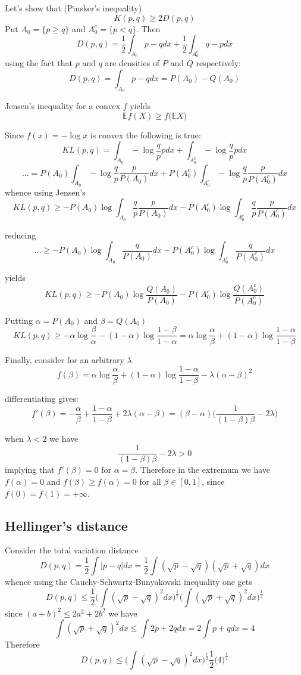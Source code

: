 \documentclass[a4paper]{article}
\newcommand{\ex}{\mathbb{E}}
\begin{document}
Let's show that (Pinsker's inequality)
\[K(p,q)\geq 2 D(p,q)\]
Put $A_0 = \{ p \geq q \}$ and $A_0^c = \{p < q\}$. Then 
\[D(p,q) = \frac{1}{2}\int_{A_0} p-q dx + \frac{1}{2}\int_{A_0^c} q - p dx \]
using the fact that $p$ and $q$ are densities of $P$ and $Q$ respectively:
\[D(p,q) = \int_{A_0} p-q dx = P(A_0) - Q(A_0)\]

Jensen's inequality for a convex $f$ yields
\[\ex f(X) \geq f\big(\ex X\big)\]

Since $f(x) = -\log x$ is convex the following is true:
\[KL(p,q) = \int_{A_0} -\log\frac{q}{p} p dx + \int_{A_0^c} -\log\frac{q}{p} p dx \]
\[\ldots = P(A_0) \int_{A_0} -\log\frac{q}{p} \frac{p}{P(A_0)} dx + P(A_0^c) \int_{A_0^c} -\log\frac{q}{p} \frac{p}{P(A_0^c)} dx \]
whence using Jensen's
\[KL(p,q) \geq  -P(A_0) \log \int_{A_0}\frac{q}{p} \frac{p}{P(A_0)} dx - P(A_0^c) \log \int_{A_0^c} \frac{q}{p} \frac{p}{P(A_0^c)} dx\]

reducing
\[\ldots \geq -P(A_0) \log \int_{A_0}\frac{q}{P(A_0)} dx -P(A_0^c) \log \int_{A_0^c} \frac{q}{P(A_0^c)} dx \]

yields
\[KL(p,q) \geq -P(A_0) \log \frac{Q(A_0)}{P(A_0)} -P(A_0^c) \log \frac{Q(A_0^c)}{P(A_0^c)} \]

Putting $\alpha = P(A_0)$ and $\beta = Q(A_0)$
\[KL(p,q) \geq -\alpha \log \frac{\beta}{\alpha} -(1-\alpha) \log \frac{1-\beta}{1-\alpha} = \alpha \log \frac{\alpha}{\beta} + (1-\alpha) \log \frac{1-\alpha}{1-\beta} \]

Finally, consider for an arbitrary $\lambda$
\[f(\beta) = \alpha \log \frac{\alpha}{\beta} + (1-\alpha) \log \frac{1-\alpha}{1-\beta} - \lambda (\alpha - \beta)^2\]

differentiating gives:
\[f'(\beta) = -\frac{\alpha}{\beta} + \frac{1-\alpha}{1-\beta} + 2\lambda (\alpha - \beta) = (\beta - \alpha)\Big(\frac{1}{(1-\beta)\beta} - 2\lambda\Big)\]

when $\lambda < 2$ we have
\[\frac{1}{(1-\beta)\beta} - 2\lambda > 0\]
implying that $f'(\beta) = 0$ for $\alpha=\beta$.
Therefore in the extremum we have $f(\alpha) = 0$ and $f(\beta)\geq f(\alpha) = 0$ for all $\beta\in [0,1]$, since $f(0)=f(1)=+\infty$.

\subsection{Hellinger's distance} %
\label{sub:hellinger_s_distance}

Consider the total variation distance
\[D(p,q) = \frac{1}{2}\int |p-q| dx = \frac{1}{2}\int (\sqrt{p}-\sqrt{q})(\sqrt{p}+\sqrt{q}) dx\]
whence using the Cauchy-Schwartz-Bunyakovski inequality one gets
\[D(p,q) \leq \frac{1}{2}\Big(\int (\sqrt{p}-\sqrt{q})^2dx\Big)^\frac{1}{2}\Big(\int (\sqrt{p}+\sqrt{q})^2dx\Big)^\frac{1}{2}\]
since $(a+b)^2\leq 2 a^2 + 2 b^2$ we have
\[\int (\sqrt{p}+\sqrt{q})^2dx \leq \int 2p+2q dx = 2 \int p+q dx = 4\]
Therefore
\[D(p,q) \leq \Big(\int (\sqrt{p}-\sqrt{q})^2dx\Big)^\frac{1}{2} \frac{1}{2}\Big(4\Big)^\frac{1}{2}\]
\end{document}
